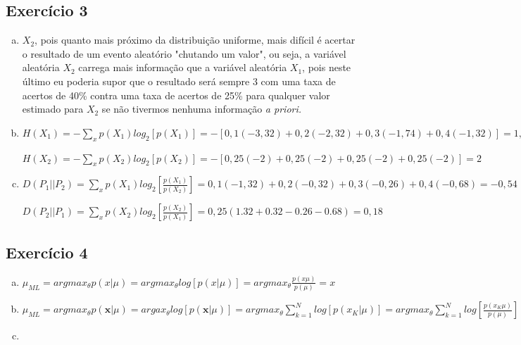 \documentclass[a4paper, 12pt]{article}
\begin{document}
\subsection*{Exercício 3}

\begin{enumerate}[a)]
\item
$X_2$, pois quanto mais próximo da distribuição uniforme, mais difícil é acertar o resultado de um evento aleatório "chutando um valor", ou seja, a variável aleatória $X_2$ carrega mais informação que a variável aleatória $X_1$, pois neste último eu poderia supor que o resultado será sempre 3 com uma taxa de acertos de 40\% contra uma taxa de acertos de 25\% para qualquer valor estimado para $X_2$ se não tivermos nenhuma informação \em a priori\em .


\item
$H(X_1) = - \sum\limits_x p(X_1)log_2[p(X_1)] = -[0,1(-3,32) + 0,2(-2,32) + 0,3(-1,74) + 0,4(-1,32)] = 1,85$

$H(X_2) = - \sum\limits_x p(X_2)log_2[p(X_2)] = - [0,25 (-2) + 0,25 (-2) + 0,25 (-2) + 0,25(-2)] = 2$


\item
$D(P_1 || P_2) = \sum\limits_x p(X_1)log_2\left[\frac{p(X_1)}{p(X_2)}\right] = 0,1(-1,32) + 0,2(-0,32) + 0,3(-0,26) + 0,4(-0,68) = -0,54$

$D(P_2 || P_1) = \sum\limits_x p(X_2)log_2\left[\frac{p(X_2)}{p(X_1)}\right] = 0,25(1.32 +  0.32 - 0.26 -0.68) = 0,18$

\end{enumerate}

\subsection*{Exercício 4}

\begin{enumerate}[a)]
\item
$\mu_{ML} = arg max_\theta p(x|\mu) = arg max_\theta log[p(x|\mu)] = arg max_\theta \frac{p(x\mu)}{p(\mu)} = x$

\item
$\mu_{ML} = arg max_\theta p(\mathbf{x}|\mu) = arg ax_\theta log[p(\mathbf{x}|\mu)] = arg max_\theta \sum\limits_{k=1}^{N} log[p(x_K|\mu)] = arg max_\theta \sum \limits_{k=1}^{N} log\left [ \frac{p(x_K\mu)}{p(\mu)}\right ] $

\item

\end{enumerate}
\end{document}
